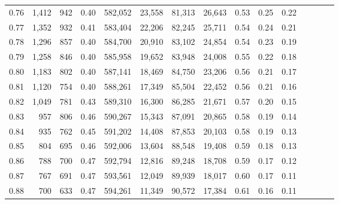 \begin{tabular}{rrrcrrrrrrrrrrr}
0.76 &   1,412 &     942 &                                       0.40 &  582,052 &   23,558 &   81,313 &   26,643 &  0.53 &  0.25 &                         0.22 \\
0.77 &   1,352 &     932 &                                       0.41 &  583,404 &   22,206 &   82,245 &   25,711 &  0.54 &  0.24 &                         0.21 \\
0.78 &   1,296 &     857 &                                       0.40 &  584,700 &   20,910 &   83,102 &   24,854 &  0.54 &  0.23 &                         0.19 \\
0.79 &   1,258 &     846 &                                       0.40 &  585,958 &   19,652 &   83,948 &   24,008 &  0.55 &  0.22 &                         0.18 \\
0.80 &   1,183 &     802 &                                       0.40 &  587,141 &   18,469 &   84,750 &   23,206 &  0.56 &  0.21 &                         0.17 \\
0.81 &   1,120 &     754 &                                       0.40 &  588,261 &   17,349 &   85,504 &   22,452 &  0.56 &  0.21 &                         0.16 \\
0.82 &   1,049 &     781 &                                       0.43 &  589,310 &   16,300 &   86,285 &   21,671 &  0.57 &  0.20 &                         0.15 \\
0.83 &     957 &     806 &                                       0.46 &  590,267 &   15,343 &   87,091 &   20,865 &  0.58 &  0.19 &                         0.14 \\
0.84 &     935 &     762 &                                       0.45 &  591,202 &   14,408 &   87,853 &   20,103 &  0.58 &  0.19 &                         0.13 \\
0.85 &     804 &     695 &                                       0.46 &  592,006 &   13,604 &   88,548 &   19,408 &  0.59 &  0.18 &                         0.13 \\
0.86 &     788 &     700 &                                       0.47 &  592,794 &   12,816 &   89,248 &   18,708 &  0.59 &  0.17 &                         0.12 \\
0.87 &     767 &     691 &                                       0.47 &  593,561 &   12,049 &   89,939 &   18,017 &  0.60 &  0.17 &                         0.11 \\
0.88 &     700 &     633 &                                       0.47 &  594,261 &   11,349 &   90,572 &   17,384 &  0.61 &  0.16 &                         0.11 \\

\end{tabular}
